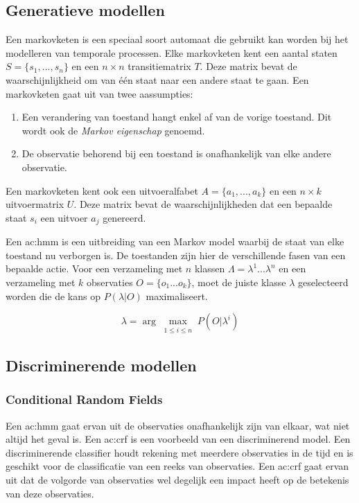 \subsection{Generatieve modellen}
Een markovketen is een speciaal soort automaat die gebruikt kan worden bij het modelleren van temporale processen. Elke markovketen kent een aantal staten $S = \{s_1, ..., s_n\}$ en een $n \times n$ transitiematrix $T$. Deze matrix bevat de waarschijnlijkheid om van één staat naar een andere staat te gaan. Een markovketen gaat uit van twee aassumpties:
\begin{enumerate}
	\item Een verandering van toestand hangt enkel af van de vorige toestand. Dit wordt ook de \textit{Markov eigenschap} genoemd.
	\item De observatie behorend bij een toestand is onafhankelijk van elke andere observatie.
\end{enumerate}
Een markovketen kent ook een uitvoeralfabet $A = \{a_1, ..., a_k\}$ en een $n \times k$ uitvoermatrix $U$. Deze matrix bevat de waarschijnlijkheden dat een bepaalde staat $s_i$ een uitvoer $a_j$ genereerd. 

Een \gls{ac:hmm} is een uitbreiding van een Markov model waarbij de staat van elke toestand nu verborgen is. De toestanden zijn hier de verschillende fasen van een bepaalde actie. Voor een verzameling met $n$ klassen $\Lambda = \lambda^1 ... \lambda^n$ en een verzameling met $k$ observaties $O = \{o_1 ... o_k\}$, moet de juiste klasse $\lambda$ geselecteerd worden die de kans op $P(\lambda | O)$ maximaliseert.

$$\lambda = \arg\max_{\substack{1 \leq i \leq n}} P(O|\lambda^i) $$


\subsection{Discriminerende modellen}
\subsubsection{Conditional Random Fields}
Een \gls{ac:hmm} gaat ervan uit de observaties onafhankelijk zijn van elkaar, wat niet altijd het geval is. Een \gls{ac:crf} is een voorbeeld van een discriminerend model. Een discriminerende classifier houdt rekening met meerdere observaties in de tijd en is geschikt voor de classificatie van een reeks van observaties. Een \gls{ac:crf} gaat ervan uit dat de volgorde van observaties wel degelijk een impact heeft op de betekenis van deze observaties.


